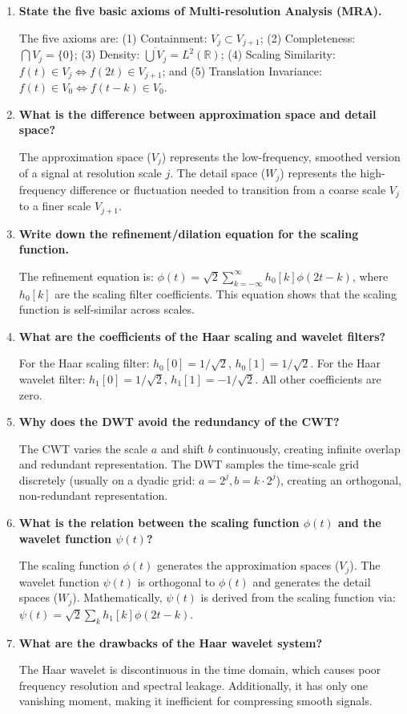 \documentclass[12pt,a4paper]{article}
\newcommand{\Q}[1]{\textbf{#1}\par\noindent\ignorespaces}
\begin{document}
\begin{tcolorbox}[exambox, title={\textbf{Frequently Asked / Viva Questions}}]
\begin{enumerate}[topsep=0pt, label=\textbf{Q\arabic*.}, itemsep=5pt]
  \item \Q{State the five basic axioms of Multi-resolution Analysis (MRA).}
        The five axioms are: (1) Containment: $V_j \subset V_{j+1}$; (2) Completeness: $\bigcap V_j = \{0\}$; (3) Density: $\overline{\bigcup V_j} = L^2(\mathbb{R})$; (4) Scaling Similarity: $f(t) \in V_j \iff f(2t) \in V_{j+1}$; and (5) Translation Invariance: $f(t) \in V_0 \iff f(t-k) \in V_0$.

  \item \Q{What is the difference between approximation space and detail space?}
        The approximation space ($V_j$) represents the low-frequency, smoothed version of a signal at resolution scale $j$. The detail space ($W_j$) represents the high-frequency difference or fluctuation needed to transition from a coarse scale $V_j$ to a finer scale $V_{j+1}$.

  \item \Q{Write down the refinement/dilation equation for the scaling function.}
        The refinement equation is: $\phi(t) = \sqrt{2} \sum_{k=-\infty}^{\infty} h_0[k] \phi(2t-k)$, where $h_0[k]$ are the scaling filter coefficients. This equation shows that the scaling function is self-similar across scales.

  \item \Q{What are the coefficients of the Haar scaling and wavelet filters?}
        For the Haar scaling filter: $h_0[0] = 1/\sqrt{2}$, $h_0[1] = 1/\sqrt{2}$. For the Haar wavelet filter: $h_1[0] = 1/\sqrt{2}$, $h_1[1] = -1/\sqrt{2}$. All other coefficients are zero.

  \item \Q{Why does the DWT avoid the redundancy of the CWT?}
        The CWT varies the scale $a$ and shift $b$ continuously, creating infinite overlap and redundant representation. The DWT samples the time-scale grid discretely (usually on a dyadic grid: $a = 2^j, b = k \cdot 2^j$), creating an orthogonal, non-redundant representation.

  \item \Q{What is the relation between the scaling function $\phi(t)$ and the wavelet function $\psi(t)$?}
        The scaling function $\phi(t)$ generates the approximation spaces ($V_j$). The wavelet function $\psi(t)$ is orthogonal to $\phi(t)$ and generates the detail spaces ($W_j$). Mathematically, $\psi(t)$ is derived from the scaling function via: $\psi(t) = \sqrt{2} \sum_{k} h_1[k] \phi(2t-k)$.

  \item \Q{What are the drawbacks of the Haar wavelet system?}
        The Haar wavelet is discontinuous in the time domain, which causes poor frequency resolution and spectral leakage. Additionally, it has only one vanishing moment, making it inefficient for compressing smooth signals.
\end{enumerate}
\end{tcolorbox}
\end{document}
